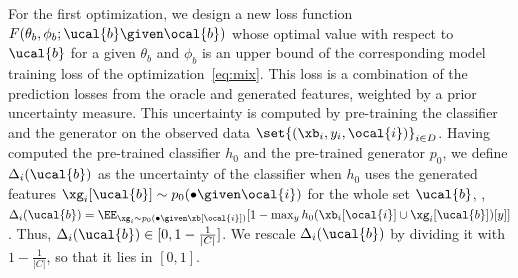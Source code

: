 \documentclass[letterpaper]{article}
\renewcommand{\cite}{\citep}
\begin{document}
 For the first optimization, we design a new loss function $F(\theta_b,\phi_b; \ucal{b} \given \ocal{b} )$ whose optimal value  with respect to $\ucal{b}$ for a given $\theta_b$ and $\phi_b$ is an upper bound of the corresponding model training loss of the optimization~\eqref{eq:mix}.  This loss is a combination of the prediction losses from the oracle and generated features, weighted by a prior uncertainty measure. This uncertainty is computed by pre-training the classifier and the generator on the observed data $\set{(\xb_i,y_i,\ocal{i})}_{i\in D}$.  Having computed the pre-trained classifier $h_0$ and the pre-trained generator $p_0$, we define
$\Delta_i(\ucal{b})$ as the uncertainty of the
classifier when $h_0$ uses the generated features $\xg_i[\ucal{b}]\sim p_0(\bullet \given \ocal{i})$ for the whole set $\ucal{b}$, \ie,  $\Delta_i(\ucal{b}) = \EE_{\xg_i\sim p_{0}(\bullet \given \xb[\ocal{i}])} [1-\max_y h_{0}(\xb_i[\ocal{i}]\cup \xg_i[\ucal{b}])[y]]$.
Thus, $\Delta_i(\ucal{b}) \in [0, 1-\frac{1}{|C|}]$. We rescale  $\Delta_i(\ucal{b})$ by dividing it with $1-\frac{1}{|C|}$, so that it lies in $[0,1]$.
\end{document}
